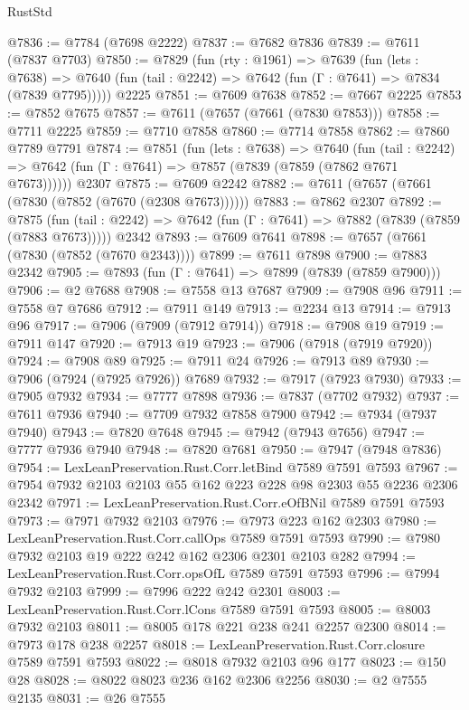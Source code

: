 \begin{lexlean}{RustStd}
\begin{coremodule}
{\begin{coremodule}
{{{{{{{{{{{{{{{{{{{{{{{{{{{{{{{{{{@7836 := @7784 (@7698 @2222)
@7837 := @7682 @7836
@7839 := @7611 (@7837 @7703)
@7850 := @7829
    (fun (rty : @1961) =>
    @7639
      (fun (lets : @7638) =>
      @7640 (fun (tail : @2242) => @7642 (fun (Γ : @7641) => @7834 (@7839 @7795)))))
    @2225
@7851 := @7609 @7638
@7852 := @7667 @2225
@7853 := @7852 @7675
@7857 := @7611 (@7657 (@7661 (@7830 @7853)))
@7858 := @7711 @2225
@7859 := @7710 @7858
@7860 := @7714 @7858
@7862 := @7860 @7789 @7791
@7874 := @7851
    (fun (lets : @7638) =>
    @7640
      (fun (tail : @2242) => @7642 (fun (Γ : @7641) => @7857 (@7839 (@7859 (@7862 @7671 @7673))))))
    @2307
@7875 := @7609 @2242
@7882 := @7611 (@7657 (@7661 (@7830 (@7852 (@7670 (@2308 @7673))))))
@7883 := @7862 @2307
@7892 := @7875
    (fun (tail : @2242) => @7642 (fun (Γ : @7641) => @7882 (@7839 (@7859 (@7883 @7673)))))
    @2342
@7893 := @7609 @7641
@7898 := @7657 (@7661 (@7830 (@7852 (@7670 @2343))))
@7899 := @7611 @7898
@7900 := @7883 @2342
@7905 := @7893 (fun (Γ : @7641) => @7899 (@7839 (@7859 @7900)))
@7906 := @2 @7688
@7908 := @7558 @13 @7687
@7909 := @7908 @96
@7911 := @7558 @7 @7686
@7912 := @7911 @149
@7913 := @2234 @13
@7914 := @7913 @96
@7917 := @7906 (@7909 (@7912 @7914))
@7918 := @7908 @19
@7919 := @7911 @147
@7920 := @7913 @19
@7923 := @7906 (@7918 (@7919 @7920))
@7924 := @7908 @89
@7925 := @7911 @24
@7926 := @7913 @89
@7930 := @7906 (@7924 (@7925 @7926)) @7689
@7932 := @7917 (@7923 @7930)
@7933 := @7905 @7932
@7934 := @7777 @7898
@7936 := @7837 (@7702 @7932)
@7937 := @7611 @7936
@7940 := @7709 @7932 @7858 @7900
@7942 := @7934 (@7937 @7940)
@7943 := @7820 @7648
@7945 := @7942 (@7943 @7656)
@7947 := @7777 @7936 @7940
@7948 := @7820 @7681
@7950 := @7947 (@7948 @7836)
@7954 := LexLeanPreservation.Rust.Corr.letBind @7589 @7591 @7593
@7967 := @7954 @7932 @2103 @2103 @55 @162 @223 @228 @98 @2303 @55 @2236 @2306 @2342
@7971 := LexLeanPreservation.Rust.Corr.eOfBNil @7589 @7591 @7593
@7973 := @7971 @7932 @2103
@7976 := @7973 @223 @162 @2303
@7980 := LexLeanPreservation.Rust.Corr.callOps @7589 @7591 @7593
@7990 := @7980 @7932 @2103 @19 @222 @242 @162 @2306 @2301 @2103 @282
@7994 := LexLeanPreservation.Rust.Corr.opsOfL @7589 @7591 @7593
@7996 := @7994 @7932 @2103
@7999 := @7996 @222 @242 @2301
@8003 := LexLeanPreservation.Rust.Corr.lCons @7589 @7591 @7593
@8005 := @8003 @7932 @2103
@8011 := @8005 @178 @221 @238 @241 @2257 @2300
@8014 := @7973 @178 @238 @2257
@8018 := LexLeanPreservation.Rust.Corr.closure @7589 @7591 @7593
@8022 := @8018 @7932 @2103 @96 @177
@8023 := @150 @28
@8028 := @8022 @8023 @236 @162 @2306 @2256
@8030 := @2 @7555 @2135
@8031 := @26 @7555
}}}}}}}}}}}}}}}}}}}}}}}}}}}}}}}}}}
\end{coremodule}}
\end{coremodule}
\end{lexlean}
